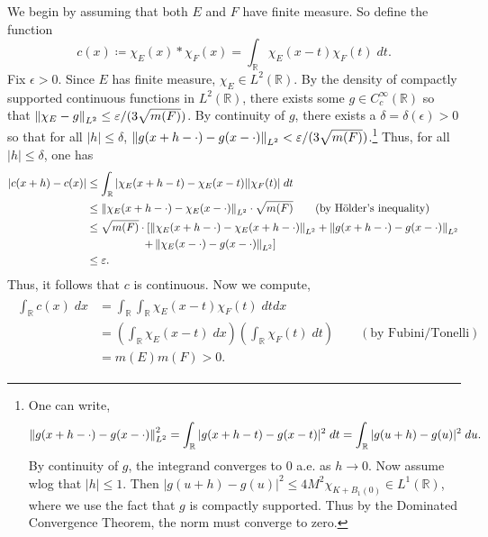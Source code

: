 \documentclass{article}
\begin{document}
		We begin by assuming that both $E$ and $F$ have finite measure. So define the function 
			\begin{equation*}
				c(x) \coloneqq \chi_{E}(x) \ast \chi_{F}(x) = \int_{\mathbb{R}}\chi_{E}(x - t)\chi_{F}(t)\;dt. 
			\end{equation*}
			Fix $\epsilon > 0$. Since $E$ has finite measure, $\chi_{E} \in L^2(\mathbb{R})$. By the density of compactly supported continuous functions in $L^2(\mathbb{R})$, there exists some $g \in C_c^\infty(\mathbb{R})$ so that $\left\Vert \chi_E - g \right\Vert_{L^2} \leq \varepsilon/(3\sqrt{m(F)})$. By continuity of $g$, there exists a $\delta = \delta(\epsilon) > 0$ so that for all $|h| \leq \delta$, $\left\Vert g(x + h - \cdot) - g(x - \cdot) \right\Vert_{L^2} < \varepsilon/(3\sqrt{m(F)})$.\footnote{
				One can write, 
				\begin{equation*}
					\left\Vert g(x + h - \cdot) - g(x - \cdot) \right\Vert_{L^2}^2 = \int_{\mathbb{R}}|g(x + h -t) - g(x - t)|^2\;dt = \int_{\mathbb{R}}|g(u + h) - g(u)|^2\;du. 
				\end{equation*}
				By continuity of $g$, the integrand converges to $0$ a.e. as $h \to 0$. Now assume wlog that $|h| \leq 1$. Then $|g(u + h) - g(u)|^2 \leq 4M^2\chi_{K + B_{1}(0)} \in L^{1}(\mathbb{R})$, where we use the fact that $g$ is compactly supported. Thus by the Dominated Convergence Theorem, the norm must converge to zero. 
			}
			Thus, for all $|h| \leq \delta$, one has 
			\begin{align*}
				\begin{split}
					|c(x + h) - c(x)| &\leq \int_{\mathbb{R}}|\chi_{E}(x + h - t) - \chi_{E}(x - t)||\chi_{F}(t)|\;dt \\
					&\leq \left\Vert \chi_{E}(x + h - \cdot) - \chi_{E}(x -\cdot) \right\Vert_{L^2}\cdot \sqrt{m(F)} \qquad (\text{by H\"older's inequality}) \\
					&\leq \sqrt{m(F)} \cdot \left[\left\Vert \chi_{E}(x + h - \cdot) - \chi_{E}(x + h - \cdot) \right\Vert_{L^2} + \left\Vert g(x + h - \cdot) - g(x - \cdot) \right\Vert_{L^2} \right. \\
					&\qquad\qquad\quad \left.+ \left\Vert \chi_{E}(x - \cdot) - g(x - \cdot) \right\Vert_{L^2}\right] \\
					&\leq \varepsilon. 
				\end{split} 
			\end{align*}
			Thus, it follows that $c$ is continuous. Now we compute, 
			\begin{align*}
				\begin{split}
					\int_{\mathbb{R}} c(x)\;dx &= \int_{\mathbb{R}}\int_{\mathbb{R}}\chi_{E}(x - t)\chi_{F}(t)\;dtdx \\
					&= \left(\int_{\mathbb{R}}\chi_{E}(x - t)\;dx\right)\left(\int_{\mathbb{R}}\chi_{F}(t)\;dt\right) \qquad (\text{by Fubini/Tonelli}) \\
					&= m(E)m(F) > 0. 
				\end{split}
			\end{align*}
\end{document}
